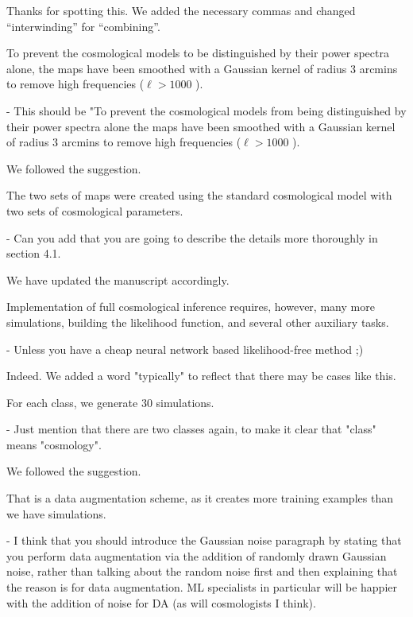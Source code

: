 \documentclass[12pt,a4paper]{article}
\newcommand{\nati}[1]{{\color[rgb]{.1,.6,.1}{NP: #1}}}
\newcommand{\mdeff}[1]{{\color[rgb]{.1,.6,.1}{MD: #1}}}
\newcommand{\1}{\b{1}}              %
\newcommand{\0}{\b{0}}              %
\begin{document}
Thanks for spotting this.
We added the necessary commas and changed ``interwinding'' for ``combining''.


\begin{mdframed}[style=comment]
To prevent the cosmological models to be distinguished by their power spectra alone, the maps have been smoothed with a Gaussian kernel of radius 3 arcmins to remove high frequencies ($\ell> 1000$ ).

- This should be "To prevent the cosmological models from being distinguished by their power spectra alone the maps have been smoothed with a Gaussian kernel of radius 3 arcmins to remove high frequencies ($\ell> 1000$ ).
\end{mdframed}

We followed the suggestion.

\begin{mdframed}[style=comment]
The two sets of maps were created using the standard cosmological model with two sets of cosmological parameters.

- Can you add that you are going to describe the details more thoroughly in section 4.1.
\end{mdframed}

We have updated the manuscript accordingly.

\begin{mdframed}[style=comment]
Implementation of full cosmological inference requires, however, many more simulations, building the likelihood function, and several other auxiliary tasks.

- Unless you have a cheap neural network based likelihood-free method ;)
\end{mdframed}

Indeed. We added a word "typically" to reflect that there may be cases like this.

\begin{mdframed}[style=comment]
For each class, we generate 30 simulations.

- Just mention that there are two classes again, to make it clear that "class" means "cosmology".
\end{mdframed}

We followed the suggestion.


\begin{mdframed}[style=comment]
That is a data augmentation scheme, as it creates more training examples than we have simulations.

- I think that you should introduce the Gaussian noise paragraph by stating that you perform data augmentation via the addition of randomly drawn Gaussian noise, rather than talking about the random noise first and then explaining that the reason is for data augmentation. ML specialists in particular will be happier with the addition of noise for DA (as will cosmologists I think).
\end{mdframed}
\end{document}
